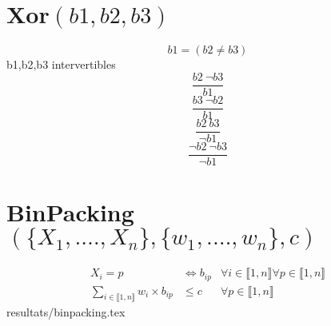 \documentclass{article}
\newcommand{\binpacking}{BinPacking$(\{X_1,.\ldots,X_n\}, \{w_1, .\ldots, w_n\}, c)~$}
\newcommand{\I}{i\in\llbracket1,n\rrbracket}
\newcommand{\PP}{p\in\llbracket1,n\rrbracket}
\newcommand{\fai}{\forall\I}
\newcommand{\fap}{\forall\PP}
\begin{document}
\section{\texorpdfstring{Xor$(b1,b2,b3)$}{xor}}
$$b1=(b2\neq b3)$$
b1,b2,b3 intervertibles
$$\frac{b2~\neg b3}{b1}$$
$$\frac{b3~\neg b2}{b1}$$
$$\frac{b2~ b3}{\neg b1}$$
$$\frac{\neg b2~\neg b3}{\neg b1}$$

\section{\texorpdfstring{\binpacking}{binpacking}}
\begin{align*}
    X_i=p & \iff b_{ip}& \fai \fap\\
    \sum_{\I} w_i \times b_{ip} & \leq c & \fap
\end{align*}
{resultats/binpacking.tex}
\end{document}
